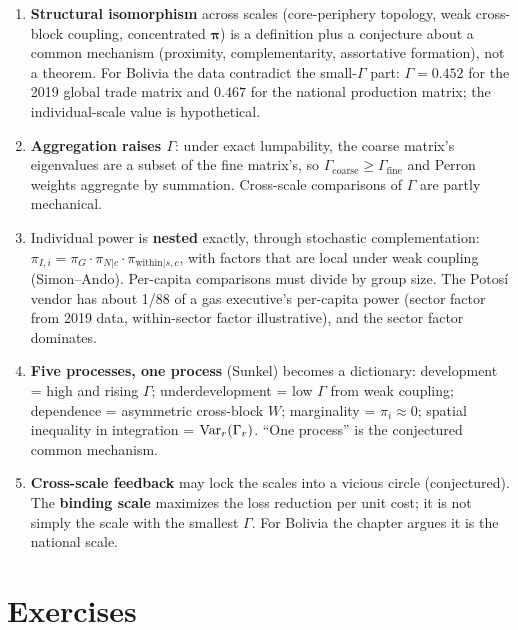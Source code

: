 \documentclass[../structural_economics_book.tex]{subfiles}
\begin{document}
\begin{enumerate}
\item \textbf{Structural isomorphism} across scales (core-periphery topology, weak cross-block coupling, concentrated $\boldsymbol{\pi}$) is a definition plus a conjecture about a common mechanism (proximity, complementarity, assortative formation), not a theorem. For Bolivia the data contradict the small-$\Gamma$ part: $\Gamma = 0.452$ for the 2019 global trade matrix and $0.467$ for the national production matrix; the individual-scale value is hypothetical.

\item \textbf{Aggregation raises $\Gamma$}: under exact lumpability, the coarse matrix's eigenvalues are a subset of the fine matrix's, so $\Gamma_{\text{coarse}} \ge \Gamma_{\text{fine}}$ and Perron weights aggregate by summation. Cross-scale comparisons of $\Gamma$ are partly mechanical.

\item Individual power is \textbf{nested} exactly, through stochastic complementation: $\pi_{I,i} = \pi_G \cdot \pi_{N|c} \cdot \pi_{\text{within}|s,c}$, with factors that are local under weak coupling (Simon--Ando). Per-capita comparisons must divide by group size. The Potos\'{i} vendor has about 1/88 of a gas executive's per-capita power (sector factor from 2019 data, within-sector factor illustrative), and the sector factor dominates.

\item \textbf{Five processes, one process} (Sunkel) becomes a dictionary: development = high and rising $\Gamma$; underdevelopment = low $\Gamma$ from weak coupling; dependence = asymmetric cross-block $W$; marginality = $\pi_i \approx 0$; spatial inequality in integration = $\operatorname{Var}_r(\Gamma_r)$. ``One process'' is the conjectured common mechanism.

\item \textbf{Cross-scale feedback} may lock the scales into a vicious circle (conjectured). The \textbf{binding scale} maximizes the loss reduction per unit cost; it is not simply the scale with the smallest $\Gamma$. For Bolivia the chapter argues it is the national scale.
\end{enumerate}


\section{Exercises}
\label{ch19:sec:exercises}
\end{document}
